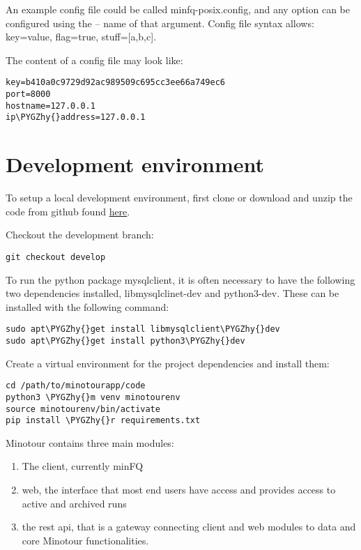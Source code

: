 \documentclass[letterpaper,10pt,english]{sphinxmanual}
\def\PYGZhy{\char`\-}
\begin{document}
An example config file could be called minfq-posix.config, and any option can be configured using the -- name of that argument. Config file syntax allows: key=value, flag=true, stuff={[}a,b,c{]}.

The content of a config file may look like:

\begin{Verbatim}[commandchars=\\\{\}]
key=b410a0c9729d92ac989509c695cc3ee66a749ec6
port=8000
hostname=127.0.0.1
ip\PYGZhy{}address=127.0.0.1
\end{Verbatim}


\chapter{Development environment}
\label{development::doc}\label{development:development-environment}
To setup a local development environment, first clone or download and unzip the code from github found \href{https://github.com/LooseLab/minotourapp.git}{here}.

Checkout the development branch:

\begin{Verbatim}[commandchars=\\\{\}]
git checkout develop
\end{Verbatim}

To run the python package mysqlclient, it is often necessary to have the following two dependencies installed, libmysqlclinet-dev and python3-dev. These can be installed with the following command:

\begin{Verbatim}[commandchars=\\\{\}]
sudo apt\PYGZhy{}get install libmysqlclient\PYGZhy{}dev
sudo apt\PYGZhy{}get install python3\PYGZhy{}dev
\end{Verbatim}

Create a virtual environment for the project dependencies and install them:

\begin{Verbatim}[commandchars=\\\{\}]
cd /path/to/minotourapp/code
python3 \PYGZhy{}m venv minotourenv
source minotourenv/bin/activate
pip install \PYGZhy{}r requirements.txt
\end{Verbatim}

Minotour contains three main modules:
\begin{enumerate}
\item {} 
The client, currently minFQ

\item {} 
web, the interface that most end users have access and provides access to active and archived runs

\item {} 
the rest api, that is a gateway connecting client and web modules to data and core Minotour functionalities.

\end{enumerate}
\end{document}
